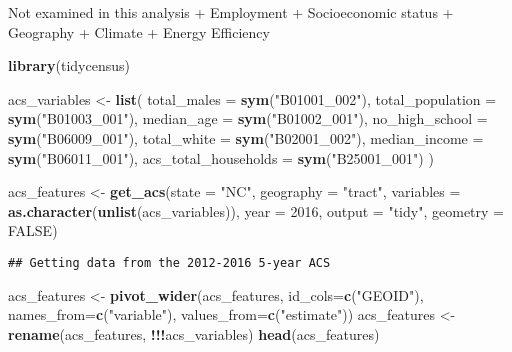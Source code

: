 \documentclass[]{article}
\newenvironment{Shaded}{\begin{snugshade}}{\end{snugshade}}
\newcommand{\DataTypeTok}[1]{\textcolor[rgb]{0.13,0.29,0.53}{#1}}
\newcommand{\DecValTok}[1]{\textcolor[rgb]{0.00,0.00,0.81}{#1}}
\newcommand{\KeywordTok}[1]{\textcolor[rgb]{0.13,0.29,0.53}{\textbf{#1}}}
\newcommand{\NormalTok}[1]{#1}
\newcommand{\OperatorTok}[1]{\textcolor[rgb]{0.81,0.36,0.00}{\textbf{#1}}}
\newcommand{\OtherTok}[1]{\textcolor[rgb]{0.56,0.35,0.01}{#1}}
\newcommand{\StringTok}[1]{\textcolor[rgb]{0.31,0.60,0.02}{#1}}
\begin{document}
Not examined in this analysis + Employment + Socioeconomic status +
Geography + Climate + Energy Efficiency

\begin{Shaded}
\begin{Highlighting}[]
\KeywordTok{library}\NormalTok{(tidycensus)}

\NormalTok{acs_variables <-}\StringTok{ }\KeywordTok{list}\NormalTok{(}
  \DataTypeTok{total_males =} \KeywordTok{sym}\NormalTok{(}\StringTok{"B01001_002"}\NormalTok{),}
  \DataTypeTok{total_population =} \KeywordTok{sym}\NormalTok{(}\StringTok{"B01003_001"}\NormalTok{),}
  \DataTypeTok{median_age =} \KeywordTok{sym}\NormalTok{(}\StringTok{"B01002_001"}\NormalTok{),}
  \DataTypeTok{no_high_school =} \KeywordTok{sym}\NormalTok{(}\StringTok{"B06009_001"}\NormalTok{),}
  \DataTypeTok{total_white =} \KeywordTok{sym}\NormalTok{(}\StringTok{"B02001_002"}\NormalTok{),}
  \DataTypeTok{median_income =} \KeywordTok{sym}\NormalTok{(}\StringTok{"B06011_001"}\NormalTok{),}
  \DataTypeTok{acs_total_households =} \KeywordTok{sym}\NormalTok{(}\StringTok{"B25001_001"}\NormalTok{)}
\NormalTok{)}

\NormalTok{acs_features <-}\StringTok{ }\KeywordTok{get_acs}\NormalTok{(}\DataTypeTok{state =} \StringTok{"NC"}\NormalTok{, }
                    \DataTypeTok{geography =} \StringTok{"tract"}\NormalTok{,}
                    \DataTypeTok{variables =} \KeywordTok{as.character}\NormalTok{(}\KeywordTok{unlist}\NormalTok{(acs_variables)),}
                    \DataTypeTok{year =} \DecValTok{2016}\NormalTok{,}
                    \DataTypeTok{output =} \StringTok{"tidy"}\NormalTok{,}
                    \DataTypeTok{geometry =} \OtherTok{FALSE}\NormalTok{)}
\end{Highlighting}
\end{Shaded}

\begin{verbatim}
## Getting data from the 2012-2016 5-year ACS
\end{verbatim}

\begin{Shaded}
\begin{Highlighting}[]
\NormalTok{acs_features <-}\StringTok{ }\KeywordTok{pivot_wider}\NormalTok{(acs_features, }\DataTypeTok{id_cols=}\KeywordTok{c}\NormalTok{(}\StringTok{"GEOID"}\NormalTok{),}
                            \DataTypeTok{names_from=}\KeywordTok{c}\NormalTok{(}\StringTok{"variable"}\NormalTok{),}
                            \DataTypeTok{values_from=}\KeywordTok{c}\NormalTok{(}\StringTok{"estimate"}\NormalTok{))}
\NormalTok{acs_features <-}\StringTok{ }\KeywordTok{rename}\NormalTok{(acs_features, }\OperatorTok{!!!}\NormalTok{acs_variables)}
\KeywordTok{head}\NormalTok{(acs_features)}
\end{Highlighting}
\end{Shaded}
\end{document}
